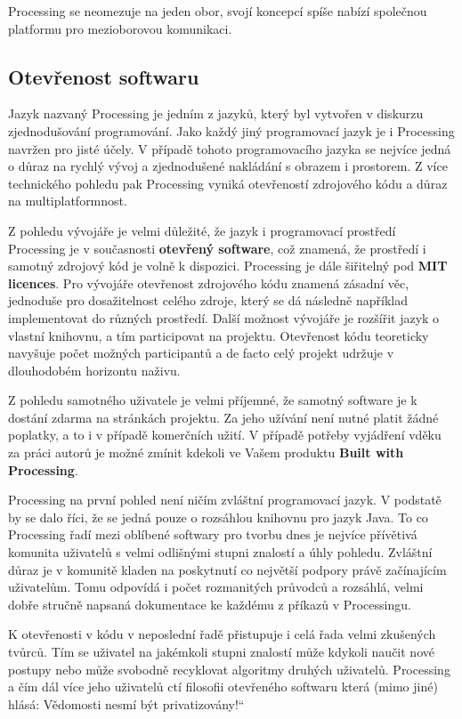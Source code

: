 \documentclass[11pt]{book}
\renewcommand\uv[1]{\quotedblbase #1\textquotedblleft}%
\newcommand{\pododdil}[1]{\subsection{#1}\label{subsec:#1}}
\newcommand{\slovnik}[1]{\textbf{\gls{#1}}\index{#1}}
\newcommand{\slovnikpl}[1]{\textbf{\glspl{#1}}\index{#1}}
\begin{document}
Processing se neomezuje na jeden obor, svojí koncepcí spíše nabízí společnou platformu pro mezioborovou komunikaci.


\pododdil{Otevřenost softwaru}

Jazyk nazvaný Processing je jedním z jazyků, který byl vytvořen v diskurzu zjednodušování programování. Jako každý jiný programovací jazyk je i Processing navržen pro jisté účely. V případě tohoto programovacího jazyka se nejvíce jedná o důraz na rychlý vývoj a zjednodušené nakládání s obrazem i prostorem. Z více technického pohledu pak Processing vyniká otevřeností zdrojového kódu a důraz na multiplatformnost.

Z pohledu vývojáře je velmi důležité, že jazyk i programovací prostředí Processing je v současnosti \slovnik{otevřený software}, což znamená, že prostředí i samotný zdrojový kód je volně k dispozici. Processing je dále šiřitelný pod \slovnikpl{MIT licence}. Pro vývojáře otevřenost zdrojového kódu znamená zásadní věc, jednoduše pro dosažitelnost celého zdroje, který se dá následně například implementovat do různých prostředí. Další možnost vývojáře je rozšířit jazyk o vlastní knihovnu, a tím participovat na projektu. Otevřenost kódu teoreticky navyšuje počet možných participantů a de facto celý projekt udržuje v dlouhodobém horizontu naživu.

Z pohledu samotného uživatele je velmi příjemné, že samotný software je k dostání zdarma na stránkách projektu. Za jeho užívání není nutné platit žádné poplatky, a to i v případě komerčních užití. V případě potřeby vyjádření vděku za práci autorů je možné zmínit kdekoli ve Vašem produktu \slovnik{Built with Processing}.


Processing na první pohled není ničím zvláštní programovací jazyk. V podstatě by se dalo říci, že se jedná pouze o rozsáhlou knihovnu pro jazyk Java. To co Processing řadí mezi oblíbené softwary pro tvorbu dnes je nejvíce přívětivá komunita uživatelů s velmi odlišnými stupni znalostí a úhly pohledu. Zvláštní důraz je v komunitě kladen na poskytnutí co největší podpory právě začínajícím uživatelům. Tomu odpovídá i počet rozmanitých průvodců a rozsáhlá, velmi dobře stručně napsaná dokumentace ke každému z příkazů v Processingu.

K otevřenosti v kódu v neposlední řadě přistupuje i celá řada velmi zkušených tvůrců. Tím se uživatel na jakémkoli stupni znalostí může kdykoli naučit nové postupy nebo může svobodně recyklovat algoritmy druhých uživatelů. Processing a čím dál více jeho uživatelů ctí filosofii otevřeného softwaru která (mimo jiné) hlásá: \uv{Vědomosti nesmí být privatizovány!}
\end{document}
